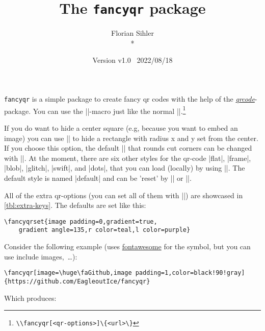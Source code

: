 \documentclass[parskip=half,english,numbers=noenddot,footnotes=nomultiple,oneside]{scrartcl}
\title{The \texttt{fancyqr} package}
\author{%
	\texorpdfstring{Florian Sihler\medskip\\*
		\fancyqr{https://github.com/EagleoutIce/fancyqr}
	}{Florian Sihler}}
\date{Version v1.0 \textendash\ 2022/08/18}
\def\ltx#1{\lstinline/#1/}
\begin{document}
   \maketitle


	\texttt{fancyqr} is a simple package to create fancy qr codes with the help of the \textit{\href{https://www.ctan.org/pkg/qrcode}{qrcode}}-package.
	You can use the |\fancyqr|-macro just like the normal |\qrcode|.\footnote{\ltx{\\fancyqr[<qr-options>]\{<url>\}}}

	If you do want to hide a center square (e.g, because you want to embed an image) you can use || to hide a rectangle with radius x and y set from the center. If you choose this option, the default |\FancyQrRoundCut| that rounds cut corners can be changed with |\FancyQrHardCut|.
	At the moment, there are six other styles for the qr-code |flat|, |frame|, |blob|, |glitch|, |swift|, and |dots|, that you can load (locally) by using ||. The default style is named |default| and can be 'reset' by || or |\FancyLoadDefault|.

	All of the extra qr-options (you can set all of them with ||) are showcased in \autoref{tbl:extra-keys}.
	The defaults are set like this:
\begin{lstlisting}
\fancyqrset{image padding=0,gradient=true,
	gradient angle=135,r color=teal,l color=purple}
\end{lstlisting}
	Consider the following example (uses \href{https://www.ctan.org/pkg/fontawesome}{fontawesome} for the symbol, but you can use include images,~\ldots):
\begin{lstlisting}
\fancyqr[image=\huge\faGithub,image padding=1,color=black!90!gray]{https://github.com/EagleoutIce/fancyqr}
\end{lstlisting}

	\parbox[c]{.3\linewidth}{Which produces:}\hfill\parbox[c]{.4\linewidth}{\raggedleft{}}\par
\end{document}
